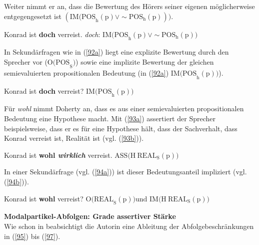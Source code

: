 Weiter nimmt er an, dass die Bewertung des Hörers seiner eigenen möglicherweise entgegengesetzt ist $(\textrm{IM(POS}_{\textrm{h}}(\textrm{p}) \lor \sim\textrm{POS}_{\textrm{h}}(\textrm{p})))$.

\begin{exe}
	\ex\label{91} 
		\begin{xlist}	
			\ex\label{91a} Konrad ist \textbf{doch} verreist.
			\ex\label{91b} \textit{doch}: $\textrm{IM(POS}_{\textrm{h}}(\textrm{p})  \lor \sim\textrm{POS}_{\textrm{h}}(\textrm{p}))$
			\hfill\hbox {\citet[106]{Doherty1987}}
		\end{xlist}
\end{exe}
In Sekundärfragen  wie in (\ref{92a}) liegt eine explizite Bewertung durch den Sprecher vor ($\textrm{O(POS}_{\textrm{S}})$) sowie eine implizite Bewertung der gleichen semievaluierten propositionalen Bedeutung (in (\ref{92a}) $\textrm{IM(POS}_{\textrm{h}}(\textrm{p}))$).

\begin{exe}
	\ex\label{92} 
		\begin{xlist}	
			\ex\label{92a} Konrad ist \textbf{doch} verreist?
			\ex\label{92b} $\textrm{IM(POS}_{\textrm{h}}(\textrm{p}))$
			\hfill\hbox {\citet[107]{Doherty1987}}
		\end{xlist}
\end{exe}
Für \textit{wohl} nimmt Doherty an, dass es aus einer semievaluierten propositionalen Bedeutung eine Hypothese macht. Mit (\ref{93a}) assertiert der Sprecher bei\-spielsweise, dass er es für eine Hypothese hält, dass der Sachverhalt, dass Konrad verreist ist, Realität ist (vgl. (\ref{93b})).
\begin{exe}
	\ex\label{93} 
		\begin{xlist}	
			\ex\label{93a} Konrad ist \textbf{wohl \textit{wirklich}} verreist.
			\ex\label{93b} $\textrm{ASS(H} \ \textrm{REAL}_{\textrm{S}}(\textrm{p}))$
			\hfill\hbox {\citet[112]{Doherty1987}}
		\end{xlist}
\end{exe}
In einer Sekundärfrage  (vgl. (\ref{94a})) ist dieser Bedeutungsanteil impliziert (vgl. (\ref{94b})).
\begin{exe}
	\ex\label{94} 
		\begin{xlist}	
			\ex\label{94a} Konrad ist \textbf{wohl} verreist?
			\ex\label{94b} $\textrm{O(REAL}_{\textrm{S}}(\textrm{p}))  \textrm{und IM(H} \ \textrm{REAL}_{\textrm{S}}(\textrm{p}))$
			\hfill\hbox {\citet[112]{Doherty1987}}
		\end{xlist}
\end{exe}
\noindent
\textbf{Modalpartikel-Abfolgen: Grade assertiver Stärke}\\
Wie schon in \citet{Doherty1985} beabsichtigt die Autorin eine Ableitung der Abfolgebeschränkungen in (\ref{95}) bis (\ref{97}).

